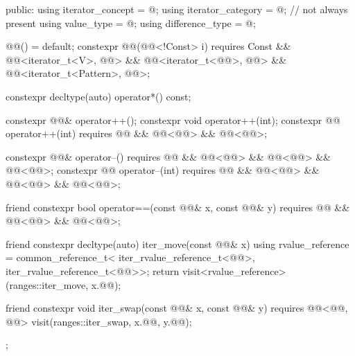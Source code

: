 \begin{codeblock}
{{  public:
    using iterator_concept = @\seebelow@;
    using iterator_category = @\seebelow@;                                // not always present
    using value_type = @\seebelow@;
    using difference_type = @\seebelow@;

    @@() = default;
    constexpr @@(@@<!Const> i)
      requires Const && @@<iterator_t<V>, @@> &&
               @@<iterator_t<@@>, @@> &&
               @@<iterator_t<Pattern>, @@>;

    constexpr decltype(auto) operator*() const;

    constexpr @@& operator++();
    constexpr void operator++(int);
    constexpr @@ operator++(int)
      requires @@ && @@<@@> &&
               @@<@@>;

    constexpr @@& operator--()
      requires @@ && @@<@@> &&
               @@<@@> && @@<@@>;
    constexpr @@ operator--(int)
      requires @@ && @@<@@> &&
               @@<@@> && @@<@@>;

    friend constexpr bool operator==(const @@& x, const @@& y)
      requires @@ && @@<@@> &&
               @@<@@>;

    friend constexpr decltype(auto) iter_move(const @@& x) {
      using rvalue_reference = common_reference_t<
        iter_rvalue_reference_t<@@>,
        iter_rvalue_reference_t<@@>>;
      return visit<rvalue_reference>(ranges::iter_move, x.@@);
    }

    friend constexpr void iter_swap(const @@& x, const @@& y)
      requires @@<@@, @@> {
      visit(ranges::iter_swap, x.@@, y.@@);
    }
  };
}
\end{codeblock}

